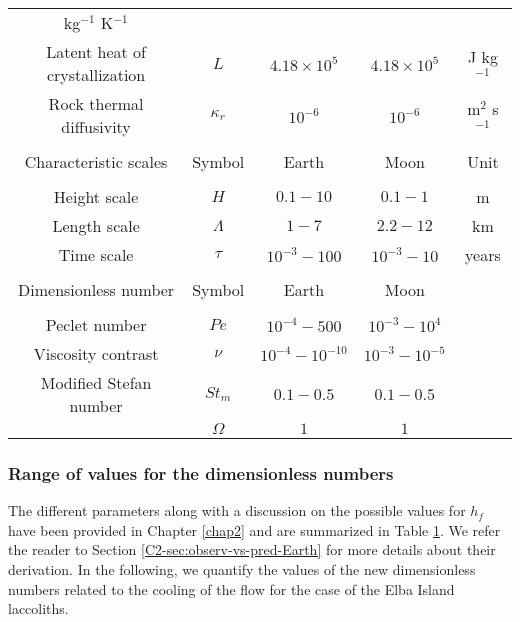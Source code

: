 \begin{table}[h!]
\begin{center}
{\begin{tabular}{c|c|c|c|c}
                                                                      kg$^{-1}$ K$^{-1}$\\
        Latent       heat       of      crystallization&       $L$       &
                                                                           $4.18\times10^5$&$4.18\times10^5$& J kg$^{-1}$\\
        Rock  thermal  diffusivity  &$\kappa_r$& $10^{-6}$  &$10^{-6}$  &
                                                                          m$^{2}$
                                                                          s$^{-1}$\\
                  &&&&\\
        \hline
        Characteristic scales & Symbol & Earth & Moon&Unit\\
        \hline
                  &&&&\\
        Height scale & $H$& $0.1-10$ &$0.1-1$ &m \\
        Length scale & $\Lambda$ & $1-7$&$2.2-12$& km \\
        Time scale & $\tau$ & $10^{-3}-100$&$10^{-3}-10$& years \\
                  &&&&\\
        \hline
        Dimensionless number & Symbol & Earth & Moon&\\
        \hline
                  &&&&\\
        Peclet number &$Pe$& $10^{-4}-500$&$10^{-3}-10^4$ &\\
        Viscosity contrast & $\nu$ & $10^{-4}-10^{-10}$& $10^{-3}-10^{-5}$&\\
        Modified Stefan number & $St_m$ & $0.1-0.5$ &  $0.1-0.5$ &\\
                  &$\Omega$ & $1$ & $1$&
                                         \label{C4-tab2}
      \end{tabular} 
    }
  \end{center}
  \label{C4-tab}
\end{table}

\subsubsection*{Range of values for the dimensionless numbers}
\label{C4-sec:range-valu-dimens-el}
 
The  different parameters  along  with a  discussion  on the  possible
values for  $h_f$ have  been provided in  Chapter \ref{chap2}  and are
summarized  in Table  \ref{C4-tab}.  We  refer the  reader to  Section
\ref{C2-sec:observ-vs-pred-Earth}   for  more   details  about   their
derivation.   In the  following, we  quantify  the values  of the  new
dimensionless numbers related to the cooling  of the flow for the case
of the Elba Island laccoliths.

